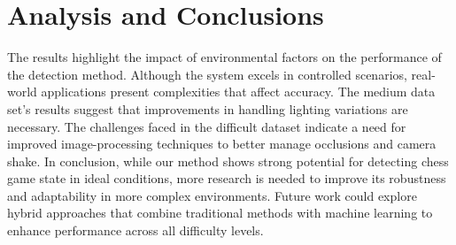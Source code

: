\documentclass{article}
\begin{document}
\section{Analysis and Conclusions}
The results highlight the impact of environmental factors on the performance of the detection method. Although the system excels in controlled scenarios, real-world applications present complexities that affect accuracy. The medium data set's results suggest that improvements in handling lighting variations are necessary. The challenges faced in the difficult dataset indicate a need for improved image-processing techniques to better manage occlusions and camera shake.
In conclusion, while our method shows strong potential for detecting chess game state in ideal conditions, more research is needed to improve its robustness and adaptability in more complex environments. Future work could explore hybrid approaches that combine traditional methods with machine learning to enhance performance across all difficulty levels.
\end{document}
